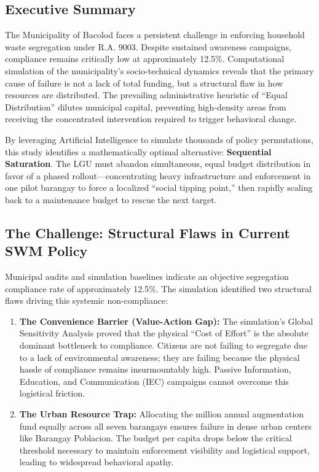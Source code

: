 \subsection*{Executive Summary}
The Municipality of Bacolod faces a persistent challenge in enforcing household waste segregation under R.A. 9003. Despite sustained awareness campaigns, compliance remains critically low at approximately 12.5\%. Computational simulation of the municipality’s socio-technical dynamics reveals that the primary cause of failure is not a lack of total funding, but a structural flaw in how resources are distributed. The prevailing administrative heuristic of “Equal Distribution” dilutes municipal capital, preventing high-density areas from receiving the concentrated intervention required to trigger behavioral change.

By leveraging Artificial Intelligence to simulate thousands of policy permutations, this study identifies a mathematically optimal alternative: \textbf{Sequential Saturation}. The LGU must abandon simultaneous, equal budget distribution in favor of a phased rollout—concentrating heavy infrastructure and enforcement in one pilot barangay to force a localized “social tipping point,” then rapidly scaling back to a maintenance budget to rescue the next target.

\subsection*{The Challenge: Structural Flaws in Current SWM Policy}
Municipal audits and simulation baselines indicate an objective segregation compliance rate of approximately 12.5\%. The simulation identified two structural flaws driving this systemic non-compliance:

\begin{enumerate}
    \item \textbf{The Convenience Barrier (Value-Action Gap):} The simulation’s Global Sensitivity Analysis proved that the physical “Cost of Effort” is the absolute dominant bottleneck to compliance. Citizens are not failing to segregate due to a lack of environmental awareness; they are failing because the physical hassle of compliance remains insurmountably high. Passive Information, Education, and Communication (IEC) campaigns cannot overcome this logistical friction.
    \item \textbf{The Urban Resource Trap:} Allocating the  million annual augmentation fund equally across all seven barangays ensures failure in dense urban centers like Barangay Poblacion. The budget per capita drops below the critical threshold necessary to maintain enforcement visibility and logistical support, leading to widespread behavioral apathy.
\end{enumerate}

